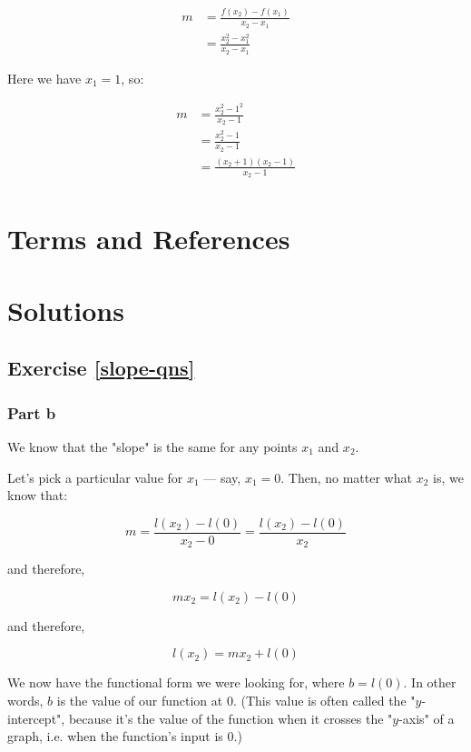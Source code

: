 \begin{align*}
m &= \frac{f(x_2) - f(x_1)}{x_2 - x_1} \\
&= \frac{x_2^2 - x_1^2}{x_2 - x_1}
\end{align*}

Here we have $x_1 = 1$, so:

\begin{align*}
m &= \frac{x_2^2 - 1^2}{x_2 - 1} \\
&= \frac{x_2^2 - 1}{x_2 - 1} \\
&= \frac{(x_2 + 1)(x_2 - 1)}{x_2 - 1} \\
\end{align*}


\newpage
\section{Terms and References}

\section{Solutions}

\subsection{Exercise \ref{slope-qns}}

\subsubsection{Part b}

We know that the "slope" is the same for any points $x_1$ and $x_2$. 

Let's pick a particular value for $x_1$ --- say, $x_1 = 0$. Then, no matter what $x_2$ is, we know that:

\begin{equation*}
m = \frac{l(x_2) - l(0)}{x_2 - 0} = \frac{l(x_2) - l(0)}{x_2}
\end{equation*}

and therefore, 

\begin{equation*}
m x_2 = l(x_2) - l(0)
\end{equation*}

and therefore, 

\begin{equation*}
l(x_2) = m x_2 + l(0)
\end{equation*}

We now have the functional form we were looking for, where $b = l(0)$. In other words, $b$ is the value of our function at 0. (This value is often called the "$y$-intercept", because it's the value of the function when it crosses the "$y$-axis" of a graph, i.e. when the function's input is 0.)


